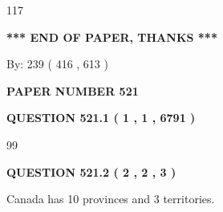 \documentclass[12pt]{article}
\begin{document}
117
 
 
   
   
 \vspace{0.2in}
 
   
   
   
   
\vspace{1.0in} 
{\textbf{\large{ *** END OF PAPER, THANKS *** }}} 
   
   
\hspace{1.0in} By: 
 239 ( 416 ,  613 )
   
   
   
   
\newpage 
\setcounter{page}{ 
   521001 } 
   
   
   
   
 {\textbf{ \Large{ PAPER NUMBER  521  }}}
   
   
\vspace{0.2in}
   
   
   
   
   
   
 \vspace{0.2in}
 
 
 
 
   
   
  
\vspace{0.2in}
  
{\textbf{\Large{QUESTION
521.1 
 ( 1 , 1 , 6791 )
}}}
  
  
 
 
\noindent{}

99
 
 
  
\vspace{0.2in}
  
{\textbf{\Large{QUESTION
521.2 
 ( 2 , 2 , 3 )
}}}
  
  
 
 
\noindent{}
 
 
Canada has 10  provinces and 3 territories.
 
 
 
 
   
   
 \vspace{0.2in}
 
   
   
\end{document}
